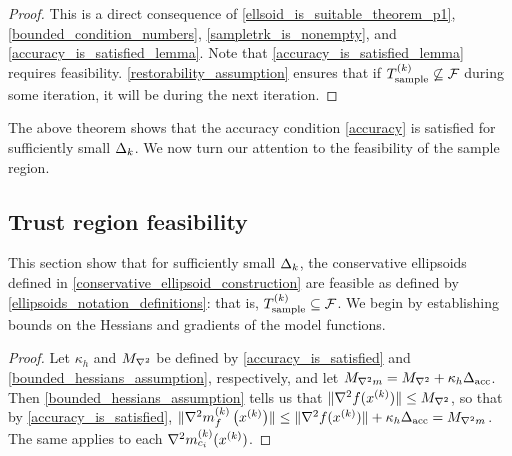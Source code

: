 \begin{proof}
This is a direct consequence of 
\cref{ellsoid_is_suitable_theorem_p1}, 
\cref{bounded_condition_numbers},
\cref{sampletrk_is_nonempty},
and \cref{accuracy_is_satisfied_lemma}.
Note that \cref{accuracy_is_satisfied_lemma} requires feasibility.
\cref{restorability_assumption} ensures that if ${T_{\text{sample}}^{(k)}} \not \subseteq {\mathcal F}$ during some iteration,
it will be during the next iteration.
\end{proof}

The above theorem shows that the accuracy condition \cref{accuracy} is satisfied for sufficiently small $\Delta_k$.   
We now turn our attention to the feasibility of the sample region.

\subsection{Trust region feasibility}
\label{ellipsoid_is_feasible_section}

This section show that for sufficiently small $\Delta_k$, the conservative ellipsoids defined in
\cref{conservative_ellipsoid_construction} are feasible as defined by \cref{ellipsoids_notation_definitions}:
that is, ${T_{\text{sample}}^{(k)}} \subseteq {\mathcal F}$.  We begin by establishing bounds on the Hessians and gradients of the model functions.

\begin{proof}

Let $\kappa_h$ and ${M_{\nabla^2}}$ be defined by \cref{accuracy_is_satisfied} and \cref{bounded_hessians_assumption}, respectively,
and let ${M_{\nabla^2 m}} = {M_{\nabla^2}} + \kappa_h {\Delta_{\textrm{acc}}}$.
Then \cref{bounded_hessians_assumption} tells us that
$\|\nabla^2 f(x^{(k)})\| \le {M_{\nabla^2}}$, so that by \cref{accuracy_is_satisfied},
$\|{\nabla^2m_f^{(k)}\left(x^{(k)}\right)}\| \le \|\nabla^2 f(x^{(k)})\| + \kappa_h{\Delta_{\textrm{acc}}} = {M_{\nabla^2 m}}$.
The same applies to each $\nabla^2 m_{c_i}^{(k)}(x^{(k)})$.
\end{proof}

